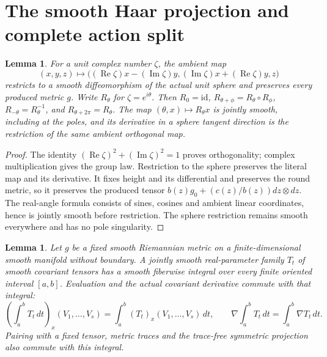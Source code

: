 \documentclass[11pt]{article}
\newtheorem{lemma}[theorem]{Lemma}
\begin{document}
\section{The smooth Haar projection and complete action split}

\begin{lemma}\label{lem:circle-action}
For a unit complex number $\zeta$, the ambient map
\[
 (x,y,z)\longmapsto
 \bigl((\operatorname{Re}\zeta)x-(\operatorname{Im}\zeta)y,
       (\operatorname{Im}\zeta)x+(\operatorname{Re}\zeta)y,z\bigr)
\]
restricts to a smooth diffeomorphism of the actual unit sphere and preserves
every produced metric $g$. Write $R_\theta$ for $\zeta=e^{i\theta}$.
Then $R_0=\mathrm{id}$, $R_{\theta+\phi}=R_\theta\circ R_\phi$,
$R_{-\theta}=R_\theta^{-1}$, and $R_{\theta+2\pi}=R_\theta$.
The map $(\theta,x)\mapsto R_\theta x$ is jointly smooth, including at
the poles, and its derivative in a sphere tangent direction is the
restriction of the same ambient orthogonal map.
\end{lemma}

\begin{proof}
The identity $(\operatorname{Re}\zeta)^2+(\operatorname{Im}\zeta)^2=1$
proves orthogonality; complex multiplication gives the group law.
Restriction to the sphere preserves the literal map and its derivative.
It fixes height and its differential and preserves the round metric,
so it preserves the produced tensor
$b(z)g_0+(c(z)/b(z))dz\otimes dz$.
The real-angle formula consists of sines, cosines and ambient linear
coordinates, hence is jointly smooth before restriction. The sphere
restriction remains smooth everywhere and has no pole singularity.
\end{proof}

\begin{lemma}\label{lem:tensor-interval-integral}
Let $g$ be a fixed smooth Riemannian metric on a finite-dimensional smooth
manifold without boundary. A jointly smooth real-parameter family $T_t$
of smooth covariant tensors has a smooth fiberwise integral over every
finite oriented interval $[a,b]$. Evaluation and the actual covariant
derivative commute with that integral:
\[
 \left(\int_a^b T_t\,dt\right)_x(V_1,\ldots,V_s)
 =\int_a^b(T_t)_x(V_1,\ldots,V_s)\,dt,
 \qquad
 \nabla\int_a^bT_t\,dt=\int_a^b\nabla T_t\,dt.
\]
Pairing with a fixed tensor, metric traces and the trace-free symmetric
projection also commute with this integral.
\end{lemma}
\end{document}

